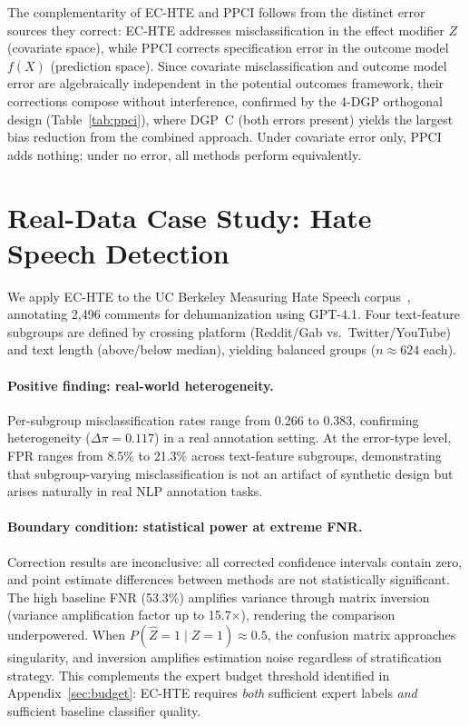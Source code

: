 The complementarity of EC-HTE and PPCI follows from the distinct error sources they correct: EC-HTE addresses misclassification in the effect modifier $Z$ (covariate space), while PPCI corrects specification error in the outcome model $f(X)$ (prediction space).
Since covariate misclassification and outcome model error are algebraically independent in the potential outcomes framework, their corrections compose without interference, confirmed by the 4-DGP orthogonal design (Table~\ref{tab:ppci}), where DGP~C (both errors present) yields the largest bias reduction from the combined approach.
Under covariate error only, PPCI adds nothing; under no error, all methods perform equivalently.

\section{Real-Data Case Study: Hate Speech Detection}
\label{app:hatespeech}

We apply EC-HTE to the UC Berkeley Measuring Hate Speech corpus~\cite{kennedy2020constructing}, annotating 2{,}496 comments for dehumanization using GPT-4.1.
Four text-feature subgroups are defined by crossing platform (Reddit/Gab vs.\ Twitter/YouTube) and text length (above/below median), yielding balanced groups ($n \approx 624$ each).

\paragraph{Positive finding: real-world heterogeneity.}
Per-subgroup misclassification rates range from 0.266 to 0.383, confirming heterogeneity ($\Delta\pi = 0.117$) in a real annotation setting.
At the error-type level, FPR ranges from 8.5\% to 21.3\% across text-feature subgroups, demonstrating that subgroup-varying misclassification is not an artifact of synthetic design but arises naturally in real NLP annotation tasks.

\paragraph{Boundary condition: statistical power at extreme FNR.}
Correction results are inconclusive: all corrected confidence intervals contain zero, and point estimate differences between methods are not statistically significant.
The high baseline FNR (53.3\%) amplifies variance through matrix inversion (variance amplification factor up to 15.7$\times$), rendering the comparison underpowered.
When $P(\hat{Z}{=}1 \mid Z{=}1) \approx 0.5$, the confusion matrix approaches singularity, and inversion amplifies estimation noise regardless of stratification strategy.
This complements the expert budget threshold identified in Appendix~\ref{sec:budget}: EC-HTE requires \emph{both} sufficient expert labels \emph{and} sufficient baseline classifier quality.

